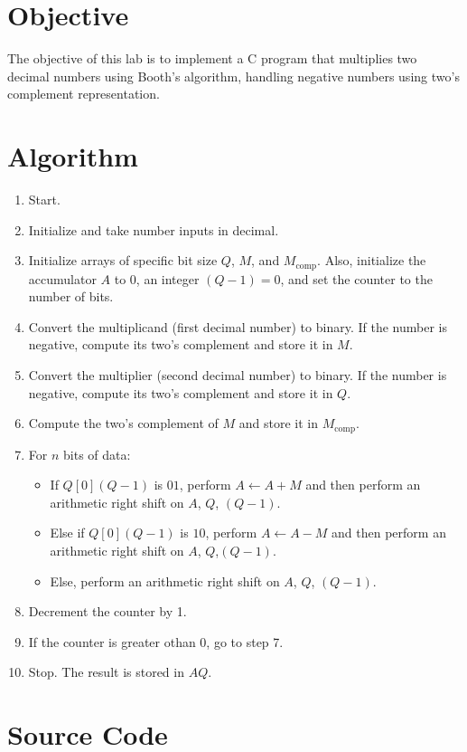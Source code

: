 \documentclass[a4paper,12pt]{article}
\begin{document}
\section*{Objective}
The objective of this lab is to implement a C program that multiplies two decimal numbers using Booth's algorithm, handling negative numbers using two's complement representation.

\section*{Algorithm}
\begin{enumerate}
    \item Start.
    \item Initialize and take number inputs in decimal.
    \item Initialize arrays of specific bit size $Q$, $M$, and $M_{\text{comp}}$. Also, initialize the accumulator $A$ to 0, an integer $(Q-1)  = 0$, and set the counter to the number of bits.
    \item Convert the multiplicand (first decimal number) to binary. If the number is negative, compute its two’s complement and store it in $M$.
    \item Convert the multiplier (second decimal number) to binary. If the number is negative, compute its two’s complement and store it in $Q$.
    \item Compute the two’s complement of $M$ and store it in $M_{\text{comp}}$.
    \item For $n$ bits of data:
    \begin{itemize}
        \item If $Q[0](Q-1)$ is $01$, perform $A \leftarrow A + M$ and then perform an arithmetic right shift on $A$, $Q$, $(Q-1)$.
        \item Else if  $Q[0](Q-1)$ is $10$, perform $A \leftarrow A - M$ and then perform an arithmetic right shift on $A$, $Q$,$(Q-1)$.
        \item Else, perform an arithmetic right shift on $A$, $Q$, $(Q-1)$.
    \end{itemize}
    \item Decrement the counter by 1.
    \item If the counter is greater othan 0, go to step 7.
    \item Stop. The result is stored in $AQ$.
\end{enumerate}

\section*{Source Code}
\end{document}
